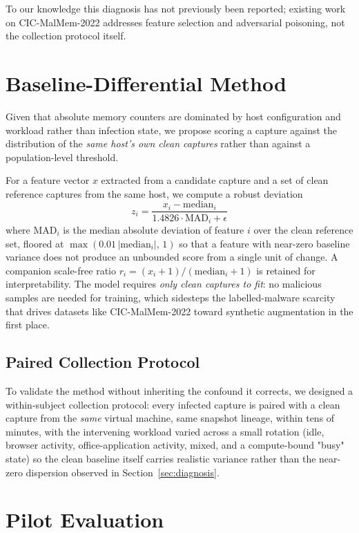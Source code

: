 \documentclass[conference]{IEEEtran}
\begin{document}
To our knowledge this diagnosis has not previously been reported; existing
work on CIC-MalMem-2022 addresses feature selection and adversarial poisoning,
not the collection protocol itself.

\section{Baseline-Differential Method}
\label{sec:method}

Given that absolute memory counters are dominated by host configuration and
workload rather than infection state, we propose scoring a capture against the
distribution of the \emph{same host's own clean captures} rather than against
a population-level threshold.

For a feature vector $x$ extracted from a candidate capture and a set of clean
reference captures from the same host, we compute a robust deviation
\begin{equation}
z_i = \frac{x_i - \text{median}_i}{1.4826 \cdot \text{MAD}_i + \epsilon}
\end{equation}
where $\text{MAD}_i$ is the median absolute deviation of feature $i$ over the
clean reference set, floored at $\max(0.01\,|\text{median}_i|,\,1)$ so that a
feature with near-zero baseline variance does not produce an unbounded score
from a single unit of change. A companion scale-free ratio
$r_i = (x_i+1)/(\text{median}_i+1)$ is retained for interpretability. The
model requires \emph{only clean captures to fit}: no malicious samples are
needed for training, which sidesteps the labelled-malware scarcity that drives
datasets like CIC-MalMem-2022 toward synthetic augmentation in the first
place.

\subsection{Paired Collection Protocol}
To validate the method without inheriting the confound it corrects, we designed
a within-subject collection protocol: every infected capture is paired with a
clean capture from the \emph{same} virtual machine, same snapshot lineage,
within tens of minutes, with the intervening workload varied across a small
rotation (idle, browser activity, office-application activity, mixed, and a
compute-bound "busy" state) so the clean baseline itself carries realistic
variance rather than the near-zero dispersion observed in
Section~\ref{sec:diagnosis}.

\section{Pilot Evaluation}
\label{sec:evaluation}
\end{document}
